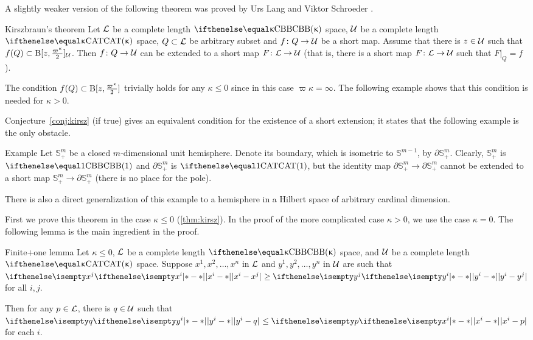 A slightly weaker version of the following theorem was proved by Urs Lang and Viktor Schroeder \cite{lang-schroeder}.

\begin{thm}{Kirszbraun's theorem}
\label{thm:kirsz+}
Let
$\mathcal{L}$ be a complete length $\Alex{\kappa}$ space, 
$\mathcal{U}$ be a complete length $\CAT\kappa$ space, 
$Q\subset \spc{L}$ be arbitrary subset
and $f\: Q\to\spc{U}$ be a short map.
Assume that there is $z\in\spc{U}$ such that 
$f(Q)\subset \oBall[z,\tfrac{\varpi\kappa}{2}]_{\spc{U}}$.
Then $f\:Q\to\spc{U}$ can be extended to a short map 
$F\:\spc{L}\to \spc{U}$
(that is, there is a short map $F\:\spc{L}\to \spc{U}$ such that $F|_Q=f$).
\end{thm}
 
The condition $f(Q)\subset \oBall[z,\tfrac{\varpi\kappa}{2}]$ trivially holds for any $\kappa\le 0$ since in this case $\varpi\kappa=\infty$. 
The following example shows that this condition is needed for $\kappa>0$.

Conjecture~\ref{conj:kirsz} (if true) gives an equivalent condition for the existence of a short extension;
it states that the following example is the only obstacle.

\begin{thm}{Example}\label{example:SS_+}
Let $\mathbb{S}^m_+$ be a closed $m$-dimensional unit hemisphere.  Denote its boundary, which is isometric to $\mathbb{S}^{m-1}$, by  $\partial\mathbb{S}^m_+$.
Clearly, $\mathbb{S}^m_+$ is $\Alex{1}$ and $\partial\mathbb{S}^m_+$ is $\CAT1$, but the identity map ${\partial\mathbb{S}^m_+}\to \partial\mathbb{S}^m_+$ cannot be extended to a short map $\mathbb{S}^m_+\to \partial\mathbb{S}^m_+$ (there is no place for the pole).

There is also a direct generalization of this example to a hemisphere in a Hilbert space of arbitrary cardinal dimension.
\end{thm}

First we prove this theorem in the case $\kappa\le 0$ (\ref{thm:kirsz}).
In the proof of the more complicated case $\kappa>0$, we use the case $\kappa=0$.
The following lemma is the main ingredient in the proof. 

\begin{thm}{Finite$\bm{+}$one lemma}\label{lem:kirsz-neg:new}
Let $\kappa\le 0$,
$\mathcal{L}$ be a complete length $\Alex{\kappa}$ space, and 
$\mathcal{U}$ be a complete length $\CAT\kappa$ space.
Suppose
$x^1,x^2,\dots,x^n$ in $\mathcal{L}$ 
and $y^1,y^2,\dots,y^n$ in $\mathcal{U}$
are
such that $\dist{x^i}{x^j}{}\ge\dist{y^i}{y^j}{}$ for all $i,j$.

Then for any $p\in\spc{L}$, there is $q\in\spc{U}$ such that $\dist{y^i}{q}{}\le\dist{x^i}{p}{}$ for each $i$.
\end{thm}

